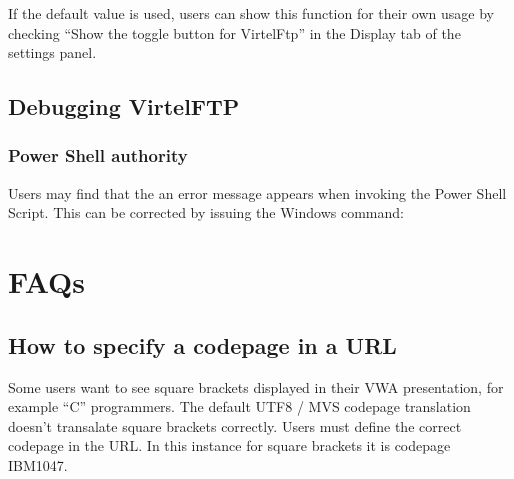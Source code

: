 \documentclass[letterpaper,10pt,english]{sphinxmanual}
\begin{document}
\sphinxAtStartPar
{}

\sphinxAtStartPar
{}

\sphinxAtStartPar
If the default value is used, users can show this function for their own usage by checking “Show the toggle button for VirtelFtp” in the Display tab of the settings panel.


\section{Debugging VirtelFTP}
\label{\detokenize{Customization:debugging-virtelftp}}

\subsection{Power Shell authority}
\label{\detokenize{Customization:power-shell-authority}}
\sphinxAtStartPar
Users may find that the an error message appears when invoking the Power Shell Script. This can be corrected by issuing the Windows command:

\begin{sphinxVerbatim}[commandchars=\\\{\}]
 
\end{sphinxVerbatim}

\ignorespaces 

\chapter{FAQs}
\label{\detokenize{Customization:faqs}}\label{\detokenize{Customization:index-127}}

\section{How to specify a codepage in a URL}
\label{\detokenize{Customization:how-to-specify-a-codepage-in-a-url}}
\sphinxAtStartPar
Some users want to see square brackets displayed in their VWA presentation, for example “C” programmers. The default UTF8 / MVS codepage translation doesn’t transalate square brackets correctly. Users must define the correct codepage in the URL. In this instance for square brackets it is codepage IBM1047.
\end{document}
